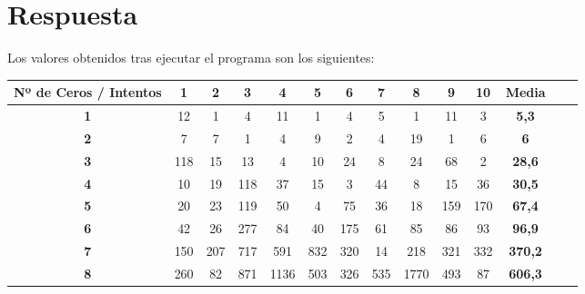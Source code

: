 \documentclass[10pt,a4paper,spanish]{report}
\begin{document}
\section{Respuesta}
\noindent
Los valores obtenidos tras ejecutar el programa son los siguientes:

\begin{table}[h!]
 \centering
 \begin{adjustbox}{max width=\textwidth}
  \begin{tabular}{*{14}{|c}|} %
   \hline
   \textbf{Nº de Ceros / Intentos} & \textbf{1} & \textbf{2} & \textbf{3} & \textbf{4} & \textbf{5} & \textbf{6} & \textbf{7} & \textbf{8} & \textbf{9} & \textbf{10} & \textbf{Media}      \\ \hline
   \textbf{1}                      & 12         & 1          & 4          & 11         & 1          & 4          & 5          & 1          & 11         & 3           & \textbf{5,3}        \\ \hline
   \textbf{2}                      & 7          & 7          & 1          & 4          & 9          & 2          & 4          & 19         & 1          & 6           & \textbf{6}          \\ \hline
   \textbf{3}                      & 118        & 15         & 13         & 4          & 10         & 24         & 8          & 24         & 68         & 2           & \textbf{28,6}       \\ \hline
   \textbf{4}                      & 10         & 19         & 118        & 37         & 15         & 3          & 44         & 8          & 15         & 36          & \textbf{30,5}       \\ \hline
   \textbf{5}                      & 20         & 23         & 119        & 50         & 4          & 75         & 36         & 18         & 159        & 170         & \textbf{67,4}       \\ \hline
   \textbf{6}                      & 42         & 26         & 277        & 84         & 40         & 175        & 61         & 85         & 86         & 93          & \textbf{96,9}       \\ \hline
   \textbf{7}                      & 150        & 207        & 717        & 591        & 832        & 320        & 14         & 218        & 321        & 332         & \textbf{370,2}      \\ \hline
   \textbf{8}                      & 260        & 82         & 871        & 1136       & 503        & 326        & 535        & 1770       & 493        & 87          & \textbf{606,3}      \\ \hline

\end{tabular}
\end{adjustbox}
\end{table}
\end{document}
